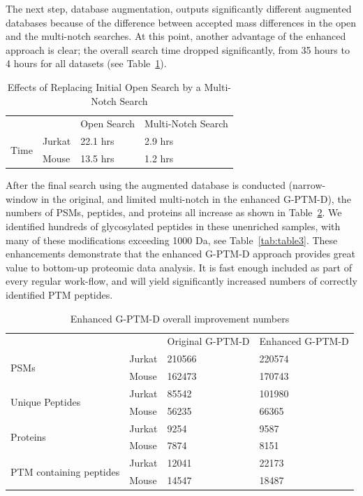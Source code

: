 \documentclass[journal=jprobs,manuscript=article]{achemso}
\begin{document}
The next step, database augmentation, outputs significantly different augmented databases because of the difference between accepted mass differences in the open and the multi-notch searches.
At this point, another advantage of the enhanced approach is clear; the overall search time dropped significantly, from 35 hours to 4 hours for all datasets (see Table~\ref{my-labelff}).

\begin{table}[]
\centering
\caption{Effects of Replacing Initial Open Search by a Multi-Notch Search}
\label{my-labelff}
\begin{tabular}{llll}
                      &        & Open Search & Multi-Notch Search\\
\multirow{2}{*}{Time} & Jurkat & 22.1 hrs         & 2.9 hrs    \\
                      & Mouse  & 13.5 hrs         & 1.2 hrs   \\
\end{tabular}
\end{table}

After the final search using the augmented database is conducted (narrow-window in the original, and limited multi-notch in the enhanced G-PTM-D), the numbers of PSMs, peptides, and proteins all increase as shown in Table~\ref{tab:table2}.
We identified hundreds of glycosylated peptides in these unenriched samples, with many of these modifications exceeding 1000 Da, see Table~\ref{tab:table3}.
These enhancements demonstrate that the enhanced G-PTM-D approach provides great value to bottom-up proteomic data analysis.
It is fast enough included as part of every regular work-flow, and will yield significantly increased numbers of correctly identified PTM peptides.

\begin{table}[]
\centering
\caption{Enhanced G-PTM-D overall improvement numbers}
\label{tab:table2}
\begin{tabular}{llll}
                      &        & Original G-PTM-D & Enhanced G-PTM-D\\
\multirow{2}{*}{PSMs} & Jurkat  & 210566   &  220574  \\
                      & Mouse    & 162473   &   170743 \\
\multirow{2}{*}{Unique Peptides} & Jurkat  & 85542   &  101980  \\
                      & Mouse    & 56235   &   66365 \\
\multirow{2}{*}{Proteins} & Jurkat  & 9254   &  9587  \\
                      & Mouse    & 7874   &   8151 \\
\multirow{2}{*}{PTM containing peptides} & Jurkat  & 12041   &  22173  \\
                      & Mouse    & 14547   &   18487 \\
\end{tabular}
\end{table}
\end{document}

